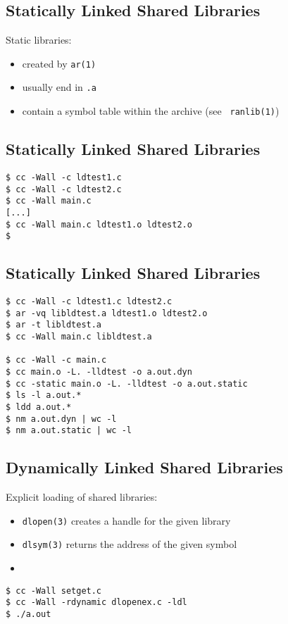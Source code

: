 \documentclass[xga]{xdvislides}
\begin{document}
\subsection{Statically Linked Shared Libraries}
Static libraries:
\begin{itemize}
	\item created by {\tt ar(1)}
	\item usually end in {\tt .a}
	\item contain a symbol table within the archive (see {\tt
		ranlib(1)})
\end{itemize}

\subsection{Statically Linked Shared Libraries}
\begin{verbatim}
$ cc -Wall -c ldtest1.c
$ cc -Wall -c ldtest2.c
$ cc -Wall main.c
[...]
$ cc -Wall main.c ldtest1.o ldtest2.o
$
\end{verbatim}

\subsection{Statically Linked Shared Libraries}
\begin{verbatim}
$ cc -Wall -c ldtest1.c ldtest2.c
$ ar -vq libldtest.a ldtest1.o ldtest2.o
$ ar -t libldtest.a
$ cc -Wall main.c libldtest.a

$ cc -Wall -c main.c
$ cc main.o -L. -lldtest -o a.out.dyn
$ cc -static main.o -L. -lldtest -o a.out.static
$ ls -l a.out.*
$ ldd a.out.*
$ nm a.out.dyn | wc -l
$ nm a.out.static | wc -l
\end{verbatim}

\subsection{Dynamically Linked Shared Libraries}
Explicit loading of shared libraries:
\begin{itemize}
	\item {\tt dlopen(3)} creates a handle for the given library
	\item {\tt dlsym(3)} returns the address of the given symbol
	\item
\end{itemize}

\begin{verbatim}
$ cc -Wall setget.c
$ cc -Wall -rdynamic dlopenex.c -ldl
$ ./a.out
\end{verbatim}
\end{document}
